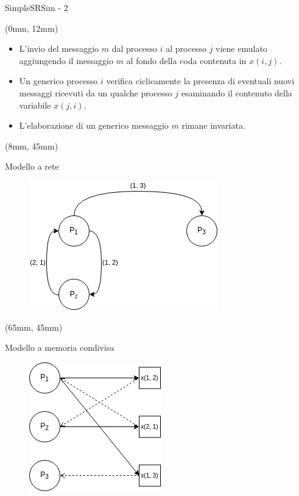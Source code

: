 \documentclass{beamer}
\begin{document}
\begin{frame}{SimpleSRSim - 2}
\begin{textblock*}{\textwidth}(0mm, 12mm)
    \begin{itemize}
        \item L'invio del messaggio $m$ dal processo $i$ al processo $j$ viene emulato aggiungendo il messaggio $m$ al fondo della coda contenuta in $x(i, j)$.
        \item Un generico processo $i$ verifica ciclicamente la presenza di eventuali nuovi messaggi ricevuti da un qualche processo $j$ esaminando il contenuto della variabile $x(j, i)$.
        \item L'elaborazione di un generico messaggio $m$ rimane invariata.
    \end{itemize}
\end{textblock*}
\begin{textblock*}{0.4\textwidth}(8mm, 45mm)
\begin{block}{Modello a rete}
\begin{figure}
    \centering
    \includegraphics[scale=0.4]{test_sr.png}
\end{figure}
\end{block}
\end{textblock*}
\begin{textblock*}{0.45\textwidth}(65mm, 45mm)

\begin{block}{Modello a memoria condivisa}
\begin{figure}
    \centering
    \includegraphics[scale=0.4]{test_sm.png}
\end{figure}
\end{block}
\end{textblock*}
\end{frame}
\end{document}
